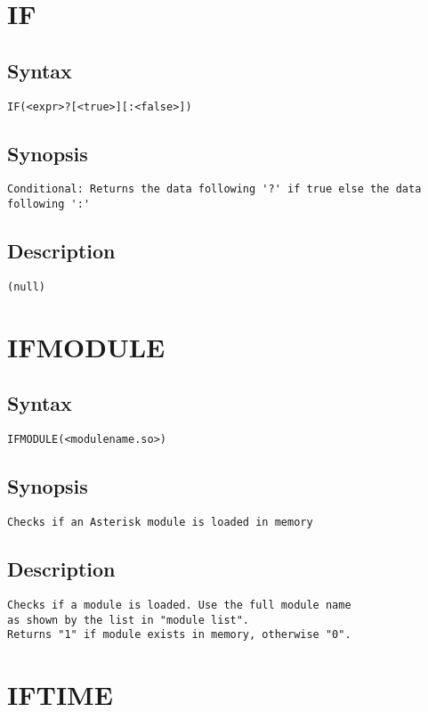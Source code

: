 \section{IF}
\subsection{Syntax}
\begin{verbatim}
IF(<expr>?[<true>][:<false>])
\end{verbatim}
\subsection{Synopsis}
\begin{verbatim}
Conditional: Returns the data following '?' if true else the data following ':'
\end{verbatim}
\subsection{Description}
\begin{verbatim}
(null)
\end{verbatim}


\section{IFMODULE}
\subsection{Syntax}
\begin{verbatim}
IFMODULE(<modulename.so>)
\end{verbatim}
\subsection{Synopsis}
\begin{verbatim}
Checks if an Asterisk module is loaded in memory
\end{verbatim}
\subsection{Description}
\begin{verbatim}
Checks if a module is loaded. Use the full module name
as shown by the list in "module list". 
Returns "1" if module exists in memory, otherwise "0".

\end{verbatim}


\section{IFTIME}
